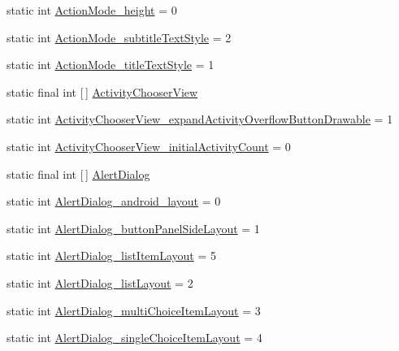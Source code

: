 \begin{DoxyCompactItemize}
\item 
static int \hyperlink{classandroid_1_1support_1_1design_1_1R_1_1styleable_a95d87caaf5fc9afdda13755e2b575d00}{Action\+Mode\+\_\+height} = 0
\item 
static int \hyperlink{classandroid_1_1support_1_1design_1_1R_1_1styleable_ab020e22226101744be54397777af6d46}{Action\+Mode\+\_\+subtitle\+Text\+Style} = 2
\item 
static int \hyperlink{classandroid_1_1support_1_1design_1_1R_1_1styleable_a3bb5c6715ae9f81fdc9431c519839eea}{Action\+Mode\+\_\+title\+Text\+Style} = 1
\item 
static final int \mbox{[}$\,$\mbox{]} \hyperlink{classandroid_1_1support_1_1design_1_1R_1_1styleable_a793c8e02386efdda6b3cf815e635b3fe}{Activity\+Chooser\+View}
\item 
static int \hyperlink{classandroid_1_1support_1_1design_1_1R_1_1styleable_adea9ca40f4470b412c930e60ace1ef3f}{Activity\+Chooser\+View\+\_\+expand\+Activity\+Overflow\+Button\+Drawable} = 1
\item 
static int \hyperlink{classandroid_1_1support_1_1design_1_1R_1_1styleable_a588768b369a43efd493bc2a06b766e2a}{Activity\+Chooser\+View\+\_\+initial\+Activity\+Count} = 0
\item 
static final int \mbox{[}$\,$\mbox{]} \hyperlink{classandroid_1_1support_1_1design_1_1R_1_1styleable_aeccb758d25f6e242e6f3a23f3873ec21}{Alert\+Dialog}
\item 
static int \hyperlink{classandroid_1_1support_1_1design_1_1R_1_1styleable_a44416be9417cbf35871f322ed12b807f}{Alert\+Dialog\+\_\+android\+\_\+layout} = 0
\item 
static int \hyperlink{classandroid_1_1support_1_1design_1_1R_1_1styleable_a91b90d0ee4293fa8574bdff3e999127f}{Alert\+Dialog\+\_\+button\+Panel\+Side\+Layout} = 1
\item 
static int \hyperlink{classandroid_1_1support_1_1design_1_1R_1_1styleable_afa996611e1e7845aac83c49748a573b9}{Alert\+Dialog\+\_\+list\+Item\+Layout} = 5
\item 
static int \hyperlink{classandroid_1_1support_1_1design_1_1R_1_1styleable_a017ed84952eefc77dac2cae8ffba67c1}{Alert\+Dialog\+\_\+list\+Layout} = 2
\item 
static int \hyperlink{classandroid_1_1support_1_1design_1_1R_1_1styleable_a34d96148dd7a784337c42ef3b86ce153}{Alert\+Dialog\+\_\+multi\+Choice\+Item\+Layout} = 3
\item 
static int \hyperlink{classandroid_1_1support_1_1design_1_1R_1_1styleable_ae17be3e7b2e63e091946463a9e26a522}{Alert\+Dialog\+\_\+single\+Choice\+Item\+Layout} = 4

\end{DoxyCompactItemize}
